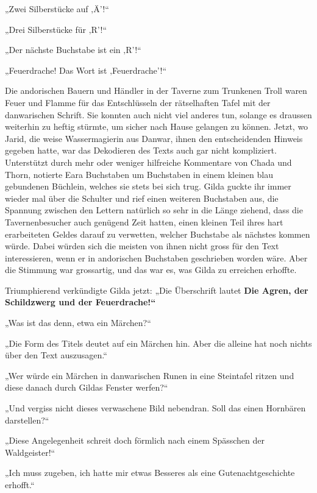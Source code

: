 „Zwei Silberstücke auf ‚Ä’!“

„Drei Silberstücke für ‚R’!“

„Der nächste Buchstabe ist ein ‚R’!“

„Feuerdrache! Das Wort ist ‚Feuerdrache’!“\bigskip



Die andorischen Bauern und Händler in der Taverne zum Trunkenen Troll waren Feuer und Flamme für das Entschlüsseln der rätselhaften Tafel mit der danwarischen Schrift. Sie konnten auch nicht viel anderes tun, solange es draussen weiterhin zu heftig stürmte, um sicher nach Hause gelangen zu können. Jetzt, wo Jarid, die weise Wassermagierin aus Danwar, ihnen den entscheidenden Hinweis gegeben hatte, war das Dekodieren des Texts auch gar nicht kompliziert. Unterstützt durch mehr oder weniger hilfreiche Kommentare von Chada und Thorn, notierte Eara Buchstaben um Buchstaben in einem kleinen blau gebundenen Büchlein, welches sie stets bei sich trug. Gilda guckte ihr immer wieder mal über die Schulter und rief einen weiteren Buchstaben aus, die Spannung zwischen den Lettern natürlich so sehr in die Länge ziehend, dass die Tavernenbesucher auch genügend Zeit hatten, einen kleinen Teil ihres hart erarbeiteten Geldes darauf zu verwetten, welcher Buchstabe als nächstes kommen würde. Dabei würden sich die meisten von ihnen nicht gross für den Text interessieren, wenn er in andorischen Buchstaben geschrieben worden wäre. Aber die Stimmung war grossartig, und das war es, was Gilda zu erreichen erhoffte.



\trennzeichen



Triumphierend verkündigte Gilda jetzt: „Die Überschrift lautet \textbf{Die Agren, der Schildzwerg und der Feuerdrache!“}

„Was ist das denn, etwa ein Märchen?“

„Die Form des Titels deutet auf ein Märchen hin. Aber die alleine hat noch nichts über den Text auszusagen.“

„Wer würde ein Märchen in danwarischen Runen in eine Steintafel ritzen und diese danach durch Gildas Fenster werfen?“

„Und vergiss nicht dieses verwaschene Bild nebendran. Soll das einen Hornbären darstellen?“

„Diese Angelegenheit schreit doch förmlich nach einem Spässchen der Waldgeister!“

„Ich muss zugeben, ich hatte mir etwas Besseres als eine Gutenachtgeschichte erhofft.“

